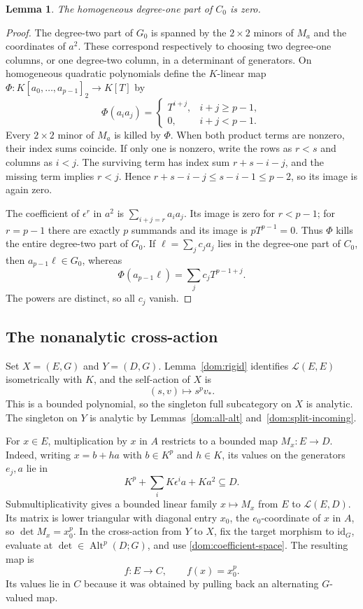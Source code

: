 \documentclass[11pt]{amsart}
\newtheorem{lemma}[theorem]{Lemma}
\theoremstyle{definition}
\theoremstyle{remark}
\numberwithin{equation}{section}
\newcommand{\cL}{\mathcal L}
\newcommand{\Alt}{\operatorname{Alt}}
\newcommand{\id}{\mathrm{id}}
\theoremstyle{plain}
\theoremstyle{definition}
\theoremstyle{plain}
\begin{document}
\begin{lemma}\label{dom:degree-gap}
The homogeneous degree-one part of $C_0$ is zero.
\end{lemma}

\begin{proof}
The degree-two part of $G_0$ is spanned by the $2\times2$ minors of $M_a$ and the coordinates of $a^2$.
These correspond respectively to choosing two degree-one columns, or one degree-two column, in a
determinant of generators. On homogeneous quadratic polynomials define the $K$\nobreakdash-linear map
$\Phi\colon K[a_0,\ldots,a_{p-1}]_2\to K[T]$ by
\[
\Phi(a_i a_j)=
\begin{cases}
T^{i+j},&i+j\ge p-1,\\
0,&i+j<p-1.
\end{cases}
\]
Every $2\times2$ minor of $M_a$ is killed by $\Phi$. When both product terms are nonzero, their index
sums coincide. If only one is nonzero, write the rows as $r<s$ and columns as $i<j$. The surviving term
has index sum $r+s-i-j$, and the missing term implies $r<j$. Hence
$r+s-i-j\le s-i-1\le p-2$, so its image is again zero.

The coefficient of $\epsilon^r$ in $a^2$ is $\sum_{i+j=r}a_i a_j$. Its image is zero for $r<p-1$;
for $r=p-1$ there are exactly $p$ summands and its image is $pT^{p-1}=0$. Thus $\Phi$ kills the entire
degree-two part of $G_0$. If $\ell=\sum_jc_j a_j$ lies in the degree-one part of $C_0$, then
$a_{p-1}\ell\in G_0$, whereas
\[
\Phi(a_{p-1}\ell)=\sum_jc_jT^{p-1+j}.
\]
The powers are distinct, so all $c_j$ vanish.
\end{proof}

\subsection{The nonanalytic cross-action}

Set $X=(E,G)$ and $Y=(D,G)$. Lemma~\ref{dom:rigid} identifies $\cL(E,E)$ isometrically with $K$,
and the self-action of $X$ is
\[
(s,v)\longmapsto s^p v_*.
\]
This is a bounded polynomial, so the singleton full subcategory on $X$ is analytic. The singleton on $Y$
is analytic by Lemmas~\ref{dom:all-alt} and~\ref{dom:split-incoming}.

For $x\in E$, multiplication by $x$ in $A$ restricts to a bounded map $M_x\colon E\to D$.
Indeed, writing $x=b+ha$ with $b\in K^p$ and $h\in K$, its values on the generators $e_j,a$ lie in
\[
K^p+\sum_iK\epsilon^ia+Ka^2\subseteq D.
\]
Submultiplicativity gives a bounded linear family $x\mapsto M_x$ from $E$ to $\cL(E,D)$.
Its matrix is lower triangular with diagonal entry $x_0$, the $e_0$\nobreakdash-coordinate of $x$ in $A$, so $\det M_x=x_0^p$. In the cross-action from
$Y$ to $X$, fix the target morphism to $\id_G$, evaluate at $\det\in\Alt^p(D;G)$, and use
\eqref{dom:coefficient-space}. The resulting map is
\begin{equation}\label{dom:bad-coordinate}
f\colon E\longrightarrow C,\qquad f(x)=x_0^p.
\end{equation}
Its values lie in $C$ because it was obtained by pulling back an alternating $G$\nobreakdash-valued map.
\end{document}
